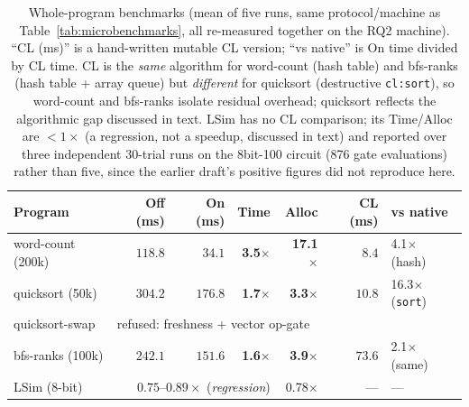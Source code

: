 \documentclass[sigplan,review,anonymous]{acmart}
\begin{document}
\begin{table}[h]
  \caption{Whole-program benchmarks (mean of five runs, same protocol/machine
  as Table~\ref{tab:microbenchmarks}, all re-measured together on the RQ2
  machine). ``CL (ms)'' is a hand-written mutable
  CL version; ``vs native'' is On time divided by CL time. CL is
  the \emph{same} algorithm for word-count (hash table) and bfs-ranks
  (hash table + array queue) but \emph{different} for quicksort (destructive
  \texttt{cl:sort}), so word-count and bfs-ranks isolate residual overhead;
  quicksort reflects the algorithmic gap discussed in text. LSim has no CL
  comparison; its Time/Alloc are $<1\times$ (a regression, not a speedup,
  discussed in text) and reported over three independent 30-trial runs on
  the 8bit-100 circuit (876 gate evaluations) rather than five, since the
  earlier draft's positive figures did not reproduce here.}
  \label{tab:programs}
  \footnotesize
  \setlength{\tabcolsep}{2pt}
  \begin{tabular}{@{}lrrrrrl@{}}
    \toprule
    Program & Off (ms) & On (ms) & Time & Alloc & CL (ms) & vs native \\
    \midrule
    word-count (200k) & $118.8$ & $34.1$ & \textbf{3.5$\times$} & \textbf{17.1$\times$} & $8.4$ & 4.1$\times$ (hash) \\
    quicksort (50k)   & $304.2$ & $176.8$ & \textbf{1.7$\times$} & \textbf{3.3$\times$} & $10.8$ & 16.3$\times$ (\texttt{sort}) \\
    quicksort-swap    & \multicolumn{6}{l}{refused: freshness + vector op-gate} \\
    bfs-ranks (100k)  & $242.1$ & $151.6$ & \textbf{1.6$\times$} & \textbf{3.9$\times$} & $73.6$ & 2.1$\times$ (same) \\
    LSim (8-bit)      & \multicolumn{3}{r}{$0.75$--$0.89\times$ (\emph{regression})} & 0.78$\times$ & --- & --- \\
    \bottomrule
  \end{tabular}
\end{table}
\end{document}
